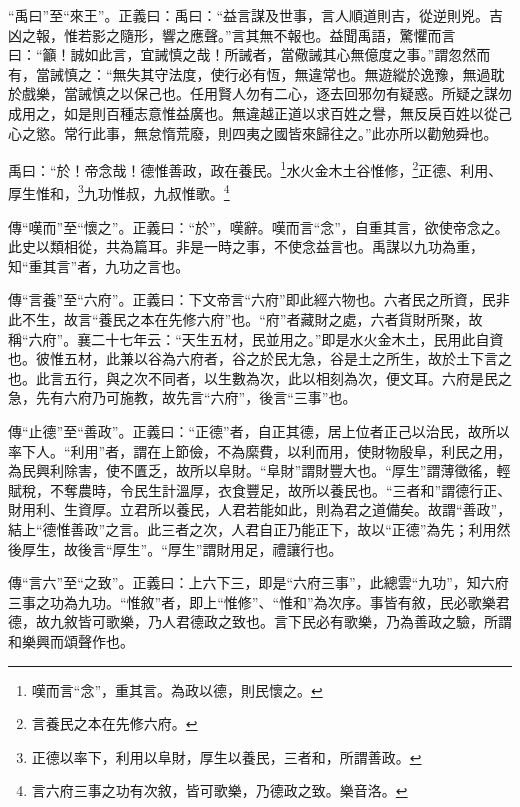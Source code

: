 {\noindent\shu{}\fzkt “禹曰”至“來王”。正義曰：禹曰：“益言謀及世事，言人順道則吉，從逆則兇。吉凶之報，惟若影之隨形，響之應聲。”言其無不報也。益聞禹語，驚懼而言曰：“籲！誠如此言，宜誡慎之哉！所誡者，當儆誡其心無億度之事。”謂忽然而有，當誡慎之：“無失其守法度，使行必有恆，無違常也。無遊縱於逸豫，無過耽於戲樂，當誡慎之以保己也。任用賢人勿有二心，逐去回邪勿有疑惑。所疑之謀勿成用之，如是則百種志意惟益廣也。無違越正道以求百姓之譽，無反戾百姓以從己心之慾。常行此事，無怠惰荒廢，則四夷之國皆來歸往之。”此亦所以勸勉舜也。 \par}

禹曰：“於！帝念哉！德惟善政，政在養民。\footnote{嘆而言“念”，重其言。為政以德，則民懷之。}水火金木土谷惟修，\footnote{言養民之本在先修六府。}正德、利用、厚生惟和，\footnote{正德以率下，利用以阜財，厚生以養民，三者和，所謂善政。}九功惟叔，九叔惟歌。\footnote{言六府三事之功有次敘，皆可歌樂，乃德政之致。樂音洛。}

{\noindent\zhuan{}\fzbyks 傳“嘆而”至“懷之”。正義曰：“於”，嘆辭。嘆而言“念”，自重其言，欲使帝念之。此史以類相從，共為篇耳。非是一時之事，不使念益言也。禹謀以九功為重，知“重其言”者，九功之言也。 \par}

{\noindent\zhuan{}\fzbyks 傳“言養”至“六府”。正義曰：下文帝言“六府”即此經六物也。六者民之所資，民非此不生，故言“養民之本在先修六府”也。“府”者藏財之處，六者貨財所聚，故稱“六府”。襄二十七年云：“天生五材，民並用之。”即是水火金木土，民用此自資也。彼惟五材，此兼以谷為六府者，谷之於民尢急，谷是土之所生，故於土下言之也。此言五行，與之次不同者，以生數為次，此以相刻為次，便文耳。六府是民之急，先有六府乃可施教，故先言“六府”，後言“三事”也。 \par}

{\noindent\zhuan{}\fzbyks 傳“止德”至“善政”。正義曰：“正德”者，自正其德，居上位者正己以治民，故所以率下人。“利用”者，謂在上節儉，不為縻費，以利而用，使財物殷阜，利民之用，為民興利除害，使不匱乏，故所以阜財。“阜財”謂財豐大也。“厚生”謂薄徵徭，輕賦稅，不奪農時，令民生計溫厚，衣食豐足，故所以養民也。“三者和”謂德行正、財用利、生資厚。立君所以養民，人君若能如此，則為君之道備矣。故謂“善政”，結上“德惟善政”之言。此三者之次，人君自正乃能正下，故以“正德”為先；利用然後厚生，故後言“厚生”。“厚生”謂財用足，禮讓行也。 \par}

{\noindent\zhuan{}\fzbyks 傳“言六”至“之致”。正義曰：上六下三，即是“六府三事”，此總雲“九功”，知六府三事之功為九功。“惟敘”者，即上“惟修”、“惟和”為次序。事皆有敘，民必歌樂君德，故九敘皆可歌樂，乃人君德政之致也。言下民必有歌樂，乃為善政之驗，所謂和樂興而頌聲作也。 \par}

